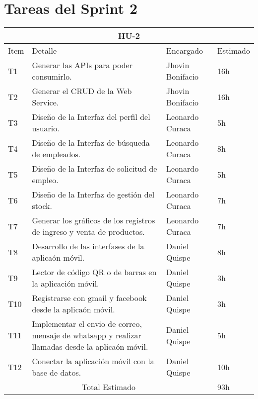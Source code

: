 \section{Tareas del Sprint 2}
\begin{table}[htbp]
	\begin{center}
		\begin{tabular}{| p{0.7cm} | p{10cm} | p{3.2cm} | p{1.8cm}|}
			\hline
			\multicolumn{4}{|c|}{HU-2}\\
			\hline
			Item & Detalle & Encargado & Estimado \\
			\hline
			T1 & Generar las APIs para poder consumirlo. & Jhovin Bonifacio & 16h \\
			\hline
			T2 & Generar el CRUD de la Web Service. & Jhovin Bonifacio & 16h \\
			\hline
			T3 & Diseño de la Interfaz del perfil del usuario. & Leonardo Curaca & 5h \\
			\hline
			T4 & Diseño de la Interfaz de búsqueda de empleados. & Leonardo Curaca & 8h \\
			\hline
			T5 & Diseño de la Interfaz de solicitud de empleo. & Leonardo Curaca & 5h \\
			\hline
			T6 & Diseño de la Interfaz de gestión del stock. & Leonardo Curaca & 7h \\
			\hline
			T7 & Generar los gráficos de los registros de ingreso y venta de productos. & Leonardo Curaca & 7h \\
			\hline
			T8 & Desarrollo de las interfases de la aplicaón móvil. & Daniel Quispe & 8h \\
			\hline
			T9 & Lector de código QR o de barras en la aplicación móvil. & Daniel Quispe & 3h \\
			\hline
			T10 & Registrarse con gmail y facebook desde la aplicaón móvil. & Daniel Quispe & 3h \\
			\hline
			T11 & Implementar el envio de correo, mensaje de whatsapp y realizar llamadas desde la aplicaón móvil. & Daniel Quispe & 5h \\
			\hline
			T12 & Conectar la aplicación móvil con la base de datos. & Daniel Quispe & 10h \\
			\hline
			\multicolumn{3}{|c|}{Total Estimado} & 93h\\
			\hline
		\end{tabular}
	\end{center}
\end{table}



